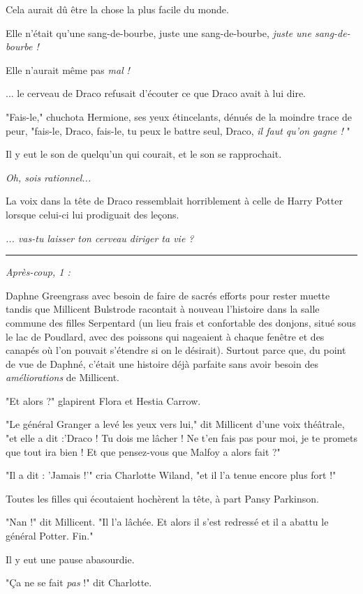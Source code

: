 Cela aurait dû être la chose la plus facile du monde.

Elle n'était qu'une sang-de-bourbe, juste une sang-de-bourbe, \emph{juste une sang-de-bourbe !} 

Elle n'aurait même pas \emph{mal}  \emph{!} 

... le cerveau de Draco refusait d'écouter ce que Draco avait à lui dire.

"Fais-le," chuchota Hermione, ses yeux étincelants, dénués de la moindre trace de peur, "fais-le, Draco, fais-le, tu peux le battre seul, Draco, \emph{il faut qu'on gagne !} "

Il y eut le son de quelqu'un qui courait, et le son se rapprochait.

\emph{Oh, sois rationnel...} 

La voix dans la tête de Draco ressemblait horriblement à celle de Harry Potter lorsque celui-ci lui prodiguait des leçons.

\emph{... vas-tu laisser ton cerveau diriger ta vie ?} 
\par\noindent\rule{\textwidth}{0.4pt}
\emph{Après-coup, 1 :} 

Daphne Greengrass avec besoin de faire de sacrés efforts pour rester muette tandis que Millicent Bulstrode racontait à nouveau l'histoire dans la salle commune des filles Serpentard (un lieu frais et confortable des donjons, situé sous le lac de Poudlard, avec des poissons qui nageaient à chaque fenêtre et des canapés où l'on pouvait s'étendre si on le désirait). Surtout parce que, du point de vue de Daphné, c'était une histoire déjà parfaite sans avoir besoin des \emph{améliorations}  de Millicent.

"Et alors ?" glapirent Flora et Hestia Carrow.

"Le général Granger a levé les yeux vers lui," dit Millicent d'une voix théâtrale, "et elle a dit :'Draco ! Tu dois me lâcher ! Ne t'en fais pas pour moi, je te promets que tout ira bien ! Et que pensez-vous que Malfoy a alors fait ?"

"Il a dit : 'Jamais !'" cria Charlotte Wiland, "et il l'a tenue encore plus fort !"

Toutes les filles qui écoutaient hochèrent la tête, à part Pansy Parkinson.

"Nan !" dit Millicent. "Il l'a lâchée. Et alors il s'est redressé et il a abattu le général Potter. Fin."

Il y eut une pause abasourdie.

"Ça ne se fait \emph{pas}  !" dit Charlotte.

